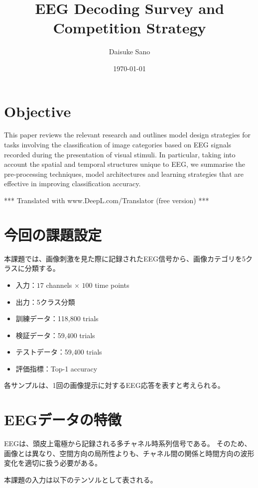 \documentclass[a4paper,11pt]{jsarticle}
\title{EEG Decoding Survey and Competition Strategy}
\author{Daisuke Sano}
\date{\today}
\begin{document}
\maketitle

\section{Objective}

This paper reviews the relevant research and outlines model design strategies for tasks involving the classification of image categories based on EEG signals recorded during the presentation of visual stimuli.
In particular, taking into account the spatial and temporal structures unique to EEG, we summarise the pre-processing techniques, model architectures and learning strategies that are effective in improving classification accuracy.

*** Translated with www.DeepL.com/Translator (free version) ***

\section{今回の課題設定}

本課題では、画像刺激を見た際に記録されたEEG信号から、画像カテゴリを5クラスに分類する。

\begin{itemize}
    \item 入力：$17$ channels $\times$ $100$ time points
    \item 出力：5クラス分類
    \item 訓練データ：118,800 trials
    \item 検証データ：59,400 trials
    \item テストデータ：59,400 trials
    \item 評価指標：Top-1 accuracy
\end{itemize}

各サンプルは、1回の画像提示に対するEEG応答を表すと考えられる。

\section{EEGデータの特徴}

EEGは、頭皮上電極から記録される多チャネル時系列信号である。
そのため、画像とは異なり、空間方向の局所性よりも、チャネル間の関係と時間方向の波形変化を適切に扱う必要がある。

本課題の入力は以下のテンソルとして表される。
\end{document}
